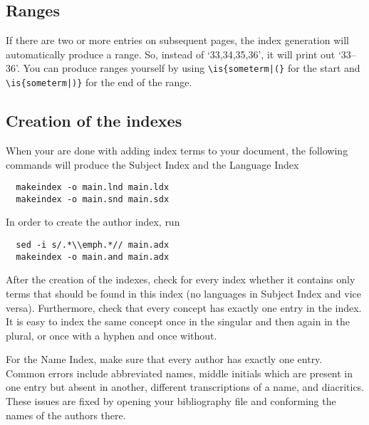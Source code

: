 \subsection{Ranges}
If there are two or more entries on subsequent pages, the index generation will automatically produce a range. So, instead of `33,34,35,36', it will print out `33--36'. You can produce ranges yourself by using \verb+\is{someterm|(}+ for the start and  \verb+\is{someterm|)}+ for the end of the range. 


\subsection{Creation of the indexes}
When your are done with adding index terms to your document, the following commands will produce the Subject Index and the Language Index
\begin{verbatim}
  makeindex -o main.lnd main.ldx
  makeindex -o main.snd main.sdx
\end{verbatim}

In order to create the author index, run

\begin{verbatim}
  sed -i s/.*\\emph.*// main.adx  
  makeindex -o main.and main.adx
\end{verbatim}

 

After the creation of the indexes, check for every index whether it contains only terms that should be found in this index (no languages in Subject Index and vice versa). Furthermore, check that every concept has exactly one entry in the index. It is easy to index the same concept once in the singular and then again in the plural, or once with a hyphen and once without. 

For the Name Index, make sure that every author has exactly one entry. Common errors include abbreviated names, middle initials which are present in one entry but absent in another, different transcriptions of a name, and diacritics. These issues are fixed by opening your bibliography file and conforming the names of the authors there.


